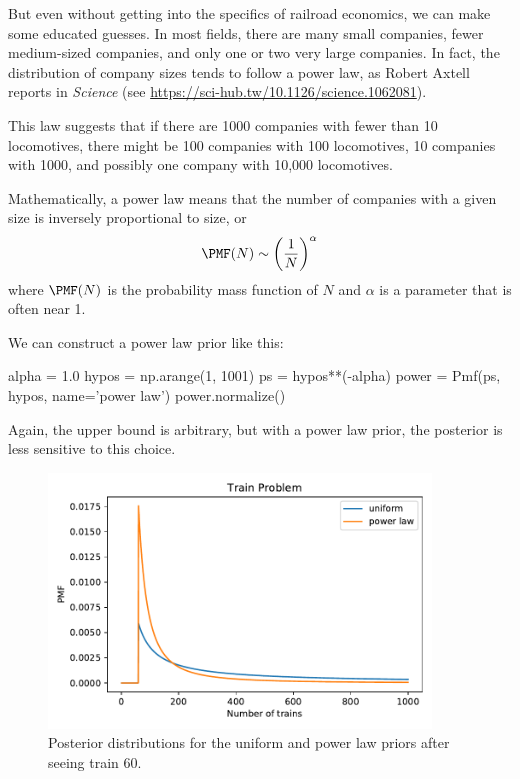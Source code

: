 \documentclass[12pt]{book}
\theoremstyle{exercise}
\begin{document}
But even without getting into the specifics of railroad economics, we
can make some educated guesses.  
In most fields, there are many small
companies, fewer medium-sized companies, and only one or two very
large companies.  
In fact, the distribution of company sizes tends to
follow a power law, as Robert Axtell reports in {\it Science} (see
\url{https://sci-hub.tw/10.1126/science.1062081}).



This law suggests that if there are 1000 companies with fewer than
10 locomotives, there might be 100 companies with 100 locomotives,
10 companies with 1000, and possibly one company with 10,000 locomotives.

Mathematically, a power law means that the number of companies
with a given size is inversely proportional to size, or
%
\[ \PMF(N) \sim \left( \frac{1}{N} \right)^{\alpha}   \]
%
where $\PMF(N)$ is the probability mass function of $N$ and $\alpha$ is
a parameter that is often near 1.

We can construct a power law prior like this:

\begin{code}
alpha = 1.0
hypos = np.arange(1, 1001)
ps = hypos**(-alpha)
power = Pmf(ps, hypos, name='power law')
power.normalize()
\end{code}

Again, the upper bound is arbitrary, but with a power law prior, the posterior is less sensitive to this choice.

\begin{figure}
\centerline{\includegraphics[width=4in]{figs/fig04-02.pdf}}
\caption{Posterior distributions for the uniform and power law priors
after seeing train 60.}
\label{fig04-02}
\end{figure}
\end{document}

